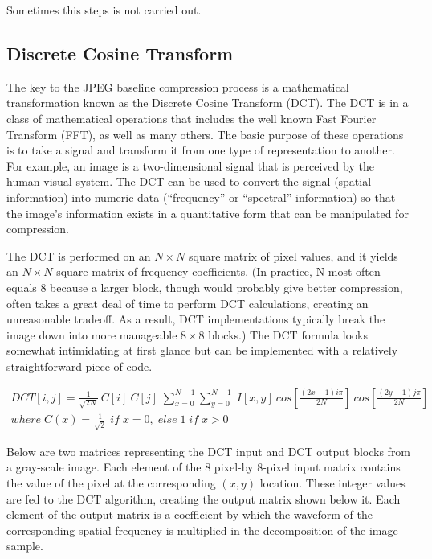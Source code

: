 Sometimes this steps is not carried out.

\subsection{Discrete Cosine Transform}

The key to the JPEG baseline compression process is a mathematical transformation known as the Discrete Cosine Transform (DCT). The DCT is in a class of mathematical operations that includes the well known Fast Fourier Transform (FFT), as well as many others. The basic purpose of these operations is to take a signal and transform it from one type of representation to another. For example, an image is a two-dimensional signal that is perceived by the human visual system. The DCT can be used to convert the signal (spatial information) into numeric data (“frequency” or “spectral” information) so that the image's information exists in a quantitative form that can be manipulated for compression.

The DCT is performed on an $N \times N$ square matrix of pixel values, and it yields an $N \times N$ square matrix of frequency coefficients. (In practice, N most often equals 8 because a larger block, though would probably give better compression, often takes a great deal of time to perform DCT calculations, creating an unreasonable tradeoff. As a result, DCT implementations typically break the image down into more manageable $8 \times 8$ blocks.) The DCT formula looks somewhat intimidating at first glance but can be implemented with a relatively straightforward piece of code.

\begin{equation}
    \begin{split}
    DCT[i,j] = \frac{1}{\sqrt{2N}} \: C[i] \: C[j] \; \sum_{x=0}^{N-1} \sum_{y=0}^{N-1} \; I[x,y] \: cos[\frac{(2x + 1)i\pi}{2N}] \: cos[\frac{(2y + 1)j\pi}{2N}]  \\
    where \; C(x) = \frac{1}{\sqrt{2}} \; if \; x=0, \; else \;1 \; if \; x>0
    \end{split}
\end{equation}

Below are two matrices representing the DCT input and DCT output blocks from a gray-scale image. Each element of the 8 pixel-by 8-pixel input matrix contains the value of the pixel at the corresponding $(x, y)$ location. These integer values are fed to the DCT algorithm, creating the output matrix shown below it. Each element of the output matrix is a coefficient by which the waveform of the corresponding spatial frequency is multiplied in the decomposition of the image sample.

